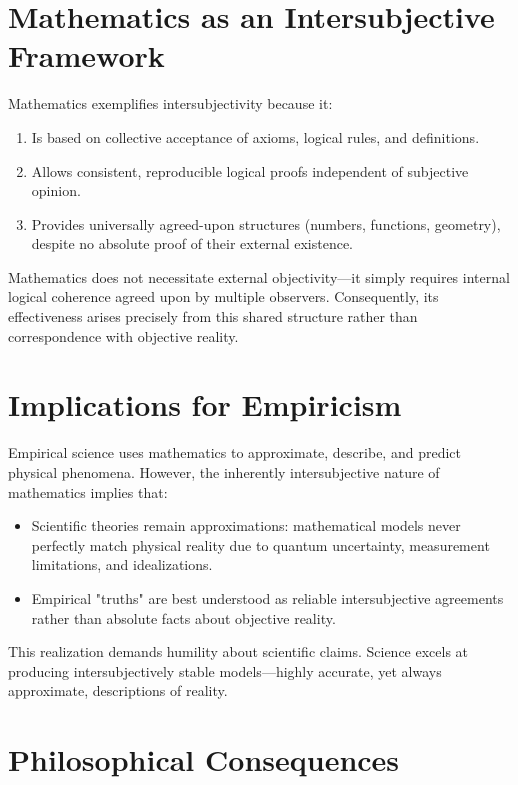 \documentclass{article}
\begin{document}
\section{Mathematics as an Intersubjective Framework}

Mathematics exemplifies intersubjectivity because it:

\begin{enumerate}
    \item Is based on collective acceptance of axioms, logical rules, and definitions.
    \item Allows consistent, reproducible logical proofs independent of subjective opinion.
    \item Provides universally agreed-upon structures (numbers, functions, geometry), despite no absolute proof of their external existence.
\end{enumerate}

Mathematics does not necessitate external objectivity—it simply requires internal logical coherence agreed upon by multiple observers. Consequently, its effectiveness arises precisely from this shared structure rather than correspondence with objective reality.

\section{Implications for Empiricism}

Empirical science uses mathematics to approximate, describe, and predict physical phenomena. However, the inherently intersubjective nature of mathematics implies that:

\begin{itemize}
    \item Scientific theories remain approximations: mathematical models never perfectly match physical reality due to quantum uncertainty, measurement limitations, and idealizations.
    \item Empirical "truths" are best understood as reliable intersubjective agreements rather than absolute facts about objective reality.
\end{itemize}

This realization demands humility about scientific claims. Science excels at producing intersubjectively stable models—highly accurate, yet always approximate, descriptions of reality.

\section{Philosophical Consequences}
\end{document}
